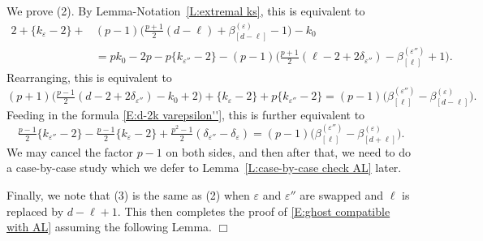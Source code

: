 \documentclass[12pt]{amsart}
\theoremstyle{definition}
\numberwithin{equation}{subsection}
\begin{document}
We prove (2). By Lemma-Notation~\ref{L:extremal ks}, this is equivalent to
\begin{align*}
2 +\{k_{\varepsilon} -2\} + &(p-1) \big(\tfrac{p+1}2 (d-\ell) +\beta_{[d-\ell]}^{(\varepsilon)}-1\big) - k_0
\\
& = pk_0 - 
2p -p\{k_{\varepsilon''} -2\} - (p-1) \big(\tfrac{p+1}2 (\ell-2+2\delta_{\varepsilon''}) -\beta_{[\ell]}^{(\varepsilon'')}+1\big) .
\end{align*}
Rearranging, this is equivalent to
$$
(p+1) \big( \tfrac{p-1}2 (d-2+2\delta_{\varepsilon''})-k_0 + 2\big) + \{k_\varepsilon - 2\} +p\{k_{\varepsilon''}-2\} = (p-1)\big( \beta_{[\ell]}^{(\varepsilon'')}- \beta_{[d-\ell]}^{(\varepsilon)}\big).
$$
Feeding in the formula \eqref{E:d-2k varepsilon''}, this is further equivalent to
$$
\tfrac{p-1}2\{k_{\varepsilon''} - 2\}-\tfrac{p-1}2\{k_\varepsilon-2\} + \tfrac{p^2-1}2(\delta_{\varepsilon''} - \delta_\varepsilon) =  (p-1)\big( \beta_{[\ell]}^{(\varepsilon'')}- \beta_{[d+\ell]}^{(\varepsilon)}\big).
$$
We may cancel the factor $p-1$ on both sides, and then after that, we need to do a case-by-case study which we defer to Lemma~\ref{L:case-by-case check AL} later.

Finally, we note that (3) is the same as (2) when $\varepsilon$ and $\varepsilon''$ are swapped and $\ell$ is replaced by $d-\ell + 1$.
This then completes the proof of \eqref{E:ghost compatible with AL} assuming the following Lemma.
 \hfill $\Box$
\end{document}
